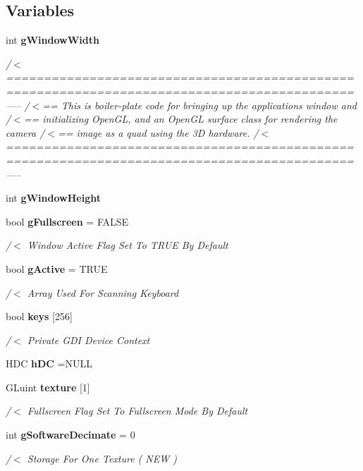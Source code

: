 \subsection*{Variables}
\begin{DoxyCompactItemize}
\item 
int \textbf{ g\+Window\+Width}
\begin{DoxyCompactList}\small\item\em /$<$============================================================================================----- /$<$== This is boiler-\/plate code for bringing up the application\textquotesingle{}s window and /$<$== initializing Open\+GL, and an Open\+GL surface class for rendering the camera /$<$== image as a quad using the 3D hardware. /$<$============================================================================================----- \end{DoxyCompactList}\item 
int \textbf{ g\+Window\+Height}
\item 
bool \textbf{ g\+Fullscreen} = F\+A\+L\+SE
\begin{DoxyCompactList}\small\item\em /$<$ Window Active Flag Set To T\+R\+UE By Default \end{DoxyCompactList}\item 
bool \textbf{ g\+Active} = T\+R\+UE
\begin{DoxyCompactList}\small\item\em /$<$ Array Used For Scanning Keyboard \end{DoxyCompactList}\item 
bool \textbf{ keys} [256]
\begin{DoxyCompactList}\small\item\em /$<$ Private G\+DI Device Context \end{DoxyCompactList}\item 
H\+DC \textbf{ h\+DC} =N\+U\+LL
\item 
G\+Luint \textbf{ texture} [1]
\begin{DoxyCompactList}\small\item\em /$<$ Fullscreen Flag Set To Fullscreen Mode By Default \end{DoxyCompactList}\item 
int \textbf{ g\+Software\+Decimate} = 0
\begin{DoxyCompactList}\small\item\em /$<$ Storage For One Texture ( N\+EW ) \end{DoxyCompactList}\item 

\end{DoxyCompactItemize}

